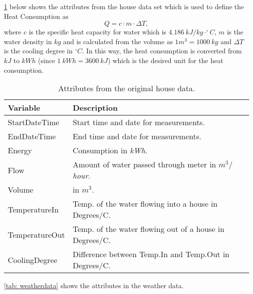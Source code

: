 \noindent \cref{tab: housedata} below shows the attributes from the house data set which is used to define the Heat Consumption as
\begin{equation}
    Q = c\cdot m \cdot \Delta T,
    \label{eq: Q_heat}
\end{equation}
where $c$ is the specific heat capacity for water which is $4.186 \ kJ/kg\cdot ^{\circ}C$, $m$ is the water density in $kg$ and is calculated from the volume as $1m^3 = 1000 \ kg$ and $\Delta T$ is the cooling degree in $^{\circ}C$. In this way, the heat consumption is converted from $kJ$ to $kWh$ (since $1 \ kWh = 3600 \ kJ$) which is the desired unit for the heat consumption. 
\begin{table}[H]
    \centering
    \begin{tabular}{ll}
     \hline
     \textbf{Variable} & \textbf{Description} \\
    \hline
    \hline
    StartDateTime  &  Start time and date for measurements.\\
    EndDateTime  &  End time and date for measurements.\\
    Energy  &  Consumption in \textit{kWh}.\\
    Flow  &  Amount of water passed through meter in \textit{$m^3/$hour}.\\
    Volume & in $m^3$.\\
    TemperatureIn  &  Temp. of the water flowing into a house in Degrees/C. \\
    TemperatureOut  & Temp. of the water flowing out of a house in Degrees/C.\\
    CoolingDegree  &  Difference between Temp.In and Temp.Out in Degrees/C. \\
    \hline
    \end{tabular}
    \caption{Attributes from the original house data.}
    \label{tab: housedata}
\end{table}
\noindent \cref{tab: weatherdata} shows the attributes in the weather data.
